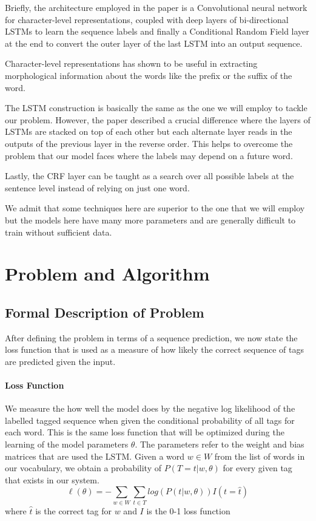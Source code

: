 \documentclass[fyp]{socreport}
\begin{document}
Briefly, the architecture employed in the paper is a Convolutional neural network
for character-level representations, coupled with deep layers of bi-directional
LSTMs to learn the sequence labels and finally a Conditional Random Field layer
at the end to convert the outer layer of the last LSTM into an output sequence.

Character-level representations has shown to be useful in extracting morphological
information about the words like the prefix or the suffix of the word.

The LSTM construction is basically the same as the one we will employ to tackle
our problem. However, the paper described a crucial difference where the
layers of LSTMs are stacked on top of each other but each alternate layer
reads in the outputs of the previous layer in the reverse order. This helps to
overcome the problem that our model faces where the labels may depend on a
future word.

Lastly, the CRF layer can be taught as a search over all possible labels at
the sentence level instead of relying on just one word.

We admit that some techniques here are superior to the one that we will employ
but the models here have many more parameters and are generally difficult to
train without sufficient data.


\label{ch:related}


\chapter{Problem and Algorithm}
\section{Formal Description of Problem}
After defining the problem in terms of a sequence prediction, we now state the
loss function that is used as a measure of how likely the correct sequence of
tags are predicted given the input.

\subsubsection{Loss Function} We measure the how well the model does by the
negative log likelihood of the labelled tagged sequence when given the
conditional probability of all tags for each word. This is the same loss
function that will be optimized during the learning of the model parameters
$\theta$. The parameters refer to the weight and bias matrices that are used
the LSTM. Given a word $w \in W$ from the list of words in our vocabulary, we
obtain a probability of $P(T=t | w, \theta)$ for every given tag that exists in
our system.
\begin{equation}
  \ell(\theta) = -\sum_{w \in W} \sum_{t \in T} log(P(t | w, \theta)) I(t = \hat{t})
\end{equation}
where $\hat{t}$ is the correct tag for $w$ and $I$ is the 0-1 loss function
\end{document}
